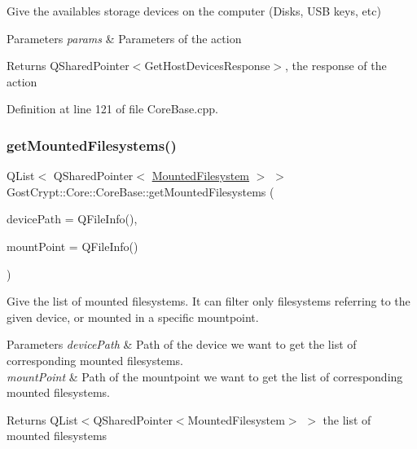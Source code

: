 Give the availables storage devices on the computer (Disks, U\+SB keys, etc) 


\begin{DoxyParams}{Parameters}
{\em params} & Parameters of the action \\
\hline
\end{DoxyParams}
\begin{DoxyReturn}{Returns}
Q\+Shared\+Pointer$<$\+Get\+Host\+Devices\+Response$>$, the response of the action 
\end{DoxyReturn}


Definition at line 121 of file Core\+Base.\+cpp.

\mbox{\label{class_gost_crypt_1_1_core_1_1_core_base_ab97891dae6ee36c867e02766a5223063}} 
\subsubsection{\texorpdfstring{get\+Mounted\+Filesystems()}{getMountedFilesystems()}}
{\footnotesize\ttfamily Q\+List$<$ Q\+Shared\+Pointer$<$ \hyperlink{struct_gost_crypt_1_1_core_1_1_mounted_filesystem}{Mounted\+Filesystem} $>$ $>$ Gost\+Crypt\+::\+Core\+::\+Core\+Base\+::get\+Mounted\+Filesystems (\begin{DoxyParamCaption}\item[{const Q\+File\+Info \&}]{device\+Path = {\ttfamily QFileInfo()},  }\item[{const Q\+File\+Info \&}]{mount\+Point = {\ttfamily QFileInfo()} }\end{DoxyParamCaption})\hspace{0.3cm}{\ttfamily [protected]}}



Give the list of mounted filesystems. It can filter only filesystems referring to the given device, or mounted in a specific mountpoint. 


\begin{DoxyParams}{Parameters}
{\em device\+Path} & Path of the device we want to get the list of corresponding mounted filesystems. \\
\hline
{\em mount\+Point} & Path of the mountpoint we want to get the list of corresponding mounted filesystems. \\
\hline
\end{DoxyParams}
\begin{DoxyReturn}{Returns}
Q\+List$<$Q\+Shared\+Pointer$<$\+Mounted\+Filesystem$>$ $>$ the list of mounted filesystems 
\end{DoxyReturn}


